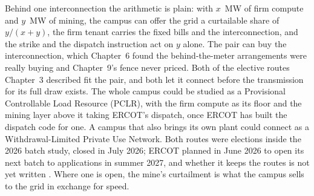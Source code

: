 Behind one interconnection the arithmetic is plain: with $x$~MW of firm compute and $y$~MW of mining, the campus can offer the grid a curtailable share of $y/(x+y)$, the firm tenant carries the fixed bills and the interconnection, and the strike and the dispatch instruction act on $y$ alone. The pair can buy the interconnection, which Chapter~6 found the behind-the-meter arrangements were really buying and Chapter~9's fence never priced. Both of the elective routes Chapter~3 described fit the pair, and both let it connect before the transmission for its full draw exists. The whole campus could be studied as a Provisional Controllable Load Resource (PCLR), with the firm compute as its floor and the mining layer above it taking ERCOT's dispatch, once ERCOT has built the dispatch code for one. A campus that also brings its own plant could connect as a Withdrawal-Limited Private Use Network. Both routes were elections inside the 2026 batch study, closed in July 2026; ERCOT planned in June 2026 to open its next batch to applications in summer 2027, and whether it keeps the routes is not yet written \autocite{ercotplanningguide2026,ercot2026protocols,ercot2026batchtopic}. Where one is open, the mine's curtailment is what the campus sells to the grid in exchange for speed. %
